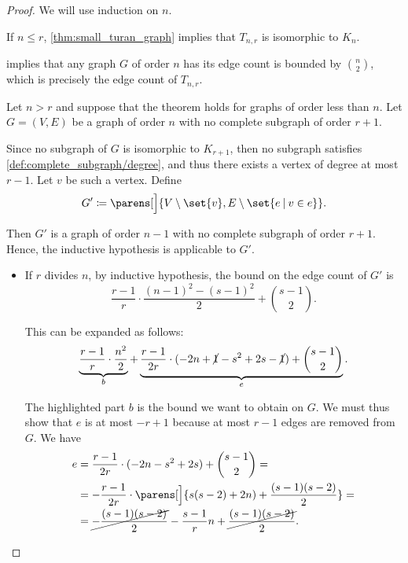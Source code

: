 \begin{proof}
  We will use induction on \( n \).

   If \( n \leq r \), \cref{thm:small_turan_graph} implies that \( T_{n,r} \) is isomorphic to \( K_n \).

   implies that any graph \( G \) of order \( n \) has its edge count is bounded by \( \binom n 2 \), which is precisely the edge count of \( T_{n,r} \).

   Let \( n > r \) and suppose that the theorem holds for graphs of order less than \( n \). Let \( G = (V, E) \) be a graph of order \( n \) with no complete subgraph of order \( r + 1 \).

  Since no subgraph of \( G \) is isomorphic to \( K_{r+1} \), then no subgraph satisfies \cref{def:complete_subgraph/degree}, and thus there exists a vertex of degree at most \( r - 1 \). Let \( v \) be such a vertex. Define
  \begin{equation*}
    G' \coloneqq \parens[\Big]{ V \setminus \set{ v }, E \setminus \set{ e \given v \in e } }.
  \end{equation*}

  Then \( G' \) is a graph of order \( n - 1 \) with no complete subgraph of order \( r + 1 \). Hence, the inductive hypothesis is applicable to \( G' \).
  \begin{itemize}
    \item If \( r \) divides \( n \), by inductive hypothesis, the bound on the edge count of \( G' \) is
    \begin{equation*}
      \frac {r - 1} r \cdot \frac {(n - 1)^2 - (s - 1)^2} 2 + \binom {s - 1} 2.
    \end{equation*}

    This can be expanded as follows:
    \begin{equation*}
      \underbrace{\frac {r - 1} r \cdot \frac {n^2} 2}_b + \underbrace{\frac {r - 1} {2r} \cdot (-2n + \cancel{1} - s^2 + 2s - \cancel{1}) + \binom {s - 1} 2}_e.
    \end{equation*}

    The highlighted part \( b \) is the bound we want to obtain on \( G \). We must thus show that \( e \) is at most \( -r + 1 \) because at most \( r - 1 \) edges are removed from \( G \). We have
    \begin{align*}
      e
      &=
      \frac {r - 1} {2r} \cdot (-2n - s^2 + 2s) + \binom {s - 1} 2
      = \\ &=
      -\frac {r - 1} {2r} \cdot \parens[\Big]{ s(s - 2) + 2n ) + \frac {(s - 1)(s - 2)} 2 }
      = \\ &=
      \cancel{-\frac {(s - 1)(s - 2)} 2} - \frac {s - 1} r n + \cancel{\frac {(s - 1)(s - 2)} 2}.
    \end{align*}


\end{itemize}
\end{proof}
